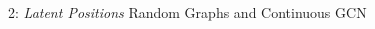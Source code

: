 \documentclass[final,dvipsnames]{beamer}
\newcommand{\vsp}{\vspace{10pt}}
\newcommand{\mycolbackwhite}[1]{
\hspace*{.01\linewidth}\begin{minipage}{.96\linewidth}
\begin{mdframed}[backgroundcolor=white,linewidth=1pt]
\vsp
#1
\vsp
\end{mdframed}
\end{minipage}
}
\begin{document}
\begin{frame}{}
\begin{columns}[t]
\begin{column}{0.45\linewidth}
\begin{block}{2: \emph{Latent Positions} Random Graphs and Continuous GCN}


\end{block}





\end{column}
\end{columns}
\end{frame}
\end{document}
